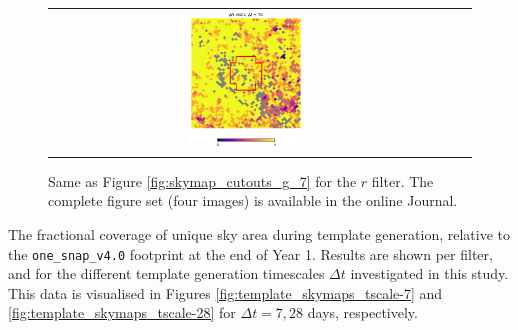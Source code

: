 \documentclass[preprintm,linenumbers]{aastex631}
\newcommand{\baseline}{\texttt{one\_snap\_v4.0}\xspace}
\begin{document}
\begin{figure}
\begin{tabular}{  c c c}
				\includegraphics[width=0.3\textwidth]{results/skymaps_cutout/skymaps_cutout_delta_first_year_one_snap_v4_0_10yrs_db_noDD_noTwi_tscale-7_nside-256_doAllTemplateMetrics_reduceCount_r_GP_noDD_noTwi.pdf} \\
			\end{tabular}
			\caption{
				 Same as Figure \ref{fig:skymap_cutouts_g_7} for the $r$ filter.  
               The complete figure set (four images) is available in the online Journal. 
			}
   \label{fig:skymap_cutouts_r_7}
		\end{figure}

		\begin{table}
			\centering
			
			\caption{
   The fractional coverage of unique sky area during template generation, relative to the \baseline footprint at the end of Year 1.
   Results are shown per filter, and for the different template generation timescales $\Delta t$ investigated in this study.
   This data is visualised in Figures \ref{fig:template_skymaps_tscale-7} and  \ref{fig:template_skymaps_tscale-28} for $\Delta t = 7, 28$ days, respectively.
			}
			\label{tab:year1_unique_coverage_templates}
		\end{table}
  
\end{document}
